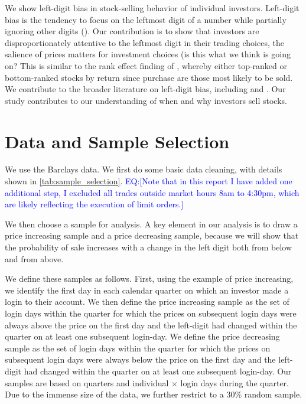 \documentclass[
	USenglish,12pt,paper=a4,numbers=noenddot,abstract=on,
	final,%
	fullsample,
    ]{scrartcl}
\begin{document}
\doublespacing

 \clearpage

We show left-digit bias in stock-selling behavior of individual investors. Left-digit bias is the tendency to focus on the leftmost digit of a number while partially ignoring other digits (\citealp{poltrock1984comparative}). Our contribution is to show that investors are disproportionately attentive to the leftmost digit in their trading choices, the salience of prices matters for investment choices (is this what we think is going on?  This is similar to the rank effect finding of \cite{hartzmark2015}, whereby either top-ranked or bottom-ranked stocks by return since purchase are those most likely to be sold. We contribute to the broader literature on left-digit bias, including \cite{lacetera2012heuristic} and \cite{shlain2018more}. Our study contributes to our understanding of when and why investors sell stocks. 

\section{Data and Sample Selection}

We use the Barclays data. We first do some basic data cleaning, with details shown in \ref{tab:sample_selection}. \textcolor{blue}{EQ:[Note that in this report I have added one additional step, I excluded all trades outside market hours 8am to 4:30pm, which are likely reflecting the execution of limit orders.]}

We then choose a sample for analysis. A key element in our analysis is to draw a price increasing sample and a price decreasing sample, because we will show that the probability of sale increases with a change in the left digit both from below and from above. 

We define these samples as follows. First, using the example of price increasing, we identify the first day in each calendar quarter on which an investor made a login to their account. We then define the price increasing sample as the set of login days within the quarter for which the prices on subsequent login days were always above the price on the first day and the left-digit had changed within the quarter on at least one subsequent login-day. We define the price decreasing sample as the set of login days within the quarter for which the prices on subsequent login days were always below the price on the first day and the left-digit had changed within the quarter on at least one subsequent login-day. Our samples are based on quarters and individual $\times$  login days during the quarter. Due to the immense size of the data, we further restrict to a 30\% random sample.
\end{document}
